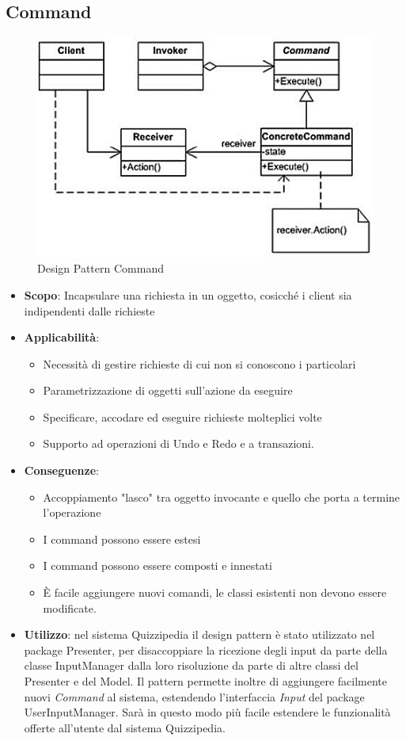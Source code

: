	
	\subsection{Command}
	\begin{figure}[h!]
	\begin{center}
		\includegraphics[scale=1]{../images/Command.png}
		\caption{Design Pattern Command}
	\end{center}
	\end{figure}
	\begin{itemize}
		\item\textbf{Scopo}: Incapsulare una richiesta in un oggetto, cosicché i
client sia indipendenti dalle richieste
		\item\textbf{Applicabilità}:
		\begin{itemize}
			\item Necessità di gestire richieste di cui non si conoscono i
particolari
			\item Parametrizzazione di oggetti sull'azione da eseguire
			\item Specificare, accodare ed eseguire richieste molteplici
volte
			\item Supporto ad operazioni di Undo e Redo e a transazioni.
		\end{itemize}
		\item\textbf{Conseguenze}:
		\begin{itemize}
			\item Accoppiamento "lasco" tra oggetto invocante e
quello che porta a termine l'operazione
			\item I command possono essere estesi
			\item I command possono essere composti e innestati
			\item È facile aggiungere nuovi comandi, le classi esistenti non devono essere modificate.
		\end{itemize}
		\item\textbf{Utilizzo}: nel sistema Quizzipedia il design pattern è stato utilizzato nel package Presenter, per disaccoppiare la ricezione degli input da parte della classe InputManager dalla loro risoluzione da parte di altre classi del Presenter e del Model. Il pattern permette inoltre di aggiungere facilmente nuovi \emph{Command} al sistema, estendendo l'interfaccia \emph{Input} del package UserInputManager. Sarà in questo modo più facile estendere le funzionalità offerte all'utente dal sistema Quizzipedia.
	\end{itemize}
